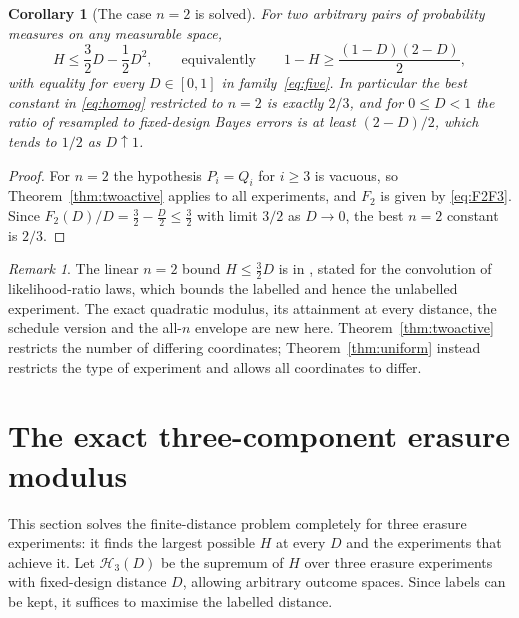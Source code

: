 \documentclass[11pt,a4paper]{article}
\newtheorem{corollary}[theorem]{Corollary}
\theoremstyle{definition}\newtheorem{definition}[theorem]{Definition}
\theoremstyle{remark}\newtheorem{remark}[theorem]{Remark}
\begin{document}
\begin{corollary}[The case $n=2$ is solved]\label{cor:n2}
For two arbitrary pairs of probability measures on any measurable space,
\[
H\le\frac32D-\frac12D^2,\qquad\text{equivalently}\qquad 1-H\ge\frac{(1-D)(2-D)}2 ,
\]
with equality for every $D\in[0,1]$ in family~\eqref{eq:five}. In particular the best constant in \eqref{eq:homog} restricted to $n=2$ is exactly $2/3$, and for $0\le D<1$ the ratio of resampled to fixed-design Bayes errors is at least $(2-D)/2$, which tends to $1/2$ as $D\uparrow1$.
\end{corollary}
\begin{proof}
For $n=2$ the hypothesis $P_i=Q_i$ for $i\ge3$ is vacuous, so Theorem~\ref{thm:twoactive} applies to all experiments, and $F_2$ is given by \eqref{eq:F2F3}. Since $F_2(D)/D=\frac32-\frac D2\le\frac32$ with limit $3/2$ as $D\to0$, the best $n=2$ constant is $2/3$.
\end{proof}

\begin{remark}\label{rem:oct}
The linear $n=2$ bound $H\le\frac32D$ is in \cite[Section~7.3]{KOct}, stated for the convolution of likelihood-ratio laws, which bounds the labelled and hence the unlabelled experiment. The exact quadratic modulus, its attainment at every distance, the schedule version and the all-$n$ envelope are new here. Theorem~\ref{thm:twoactive} restricts the number of differing coordinates; Theorem~\ref{thm:uniform} instead restricts the type of experiment and allows all coordinates to differ.
\end{remark}

\section{The exact three-component erasure modulus}\label{sec:three}
This section solves the finite-distance problem completely for three erasure experiments: it finds the largest possible $H$ at every $D$ and the experiments that achieve it. Let $\mathcal H_3(D)$ be the supremum of $H$ over three erasure experiments with fixed-design distance $D$, allowing arbitrary outcome spaces. Since labels can be kept, it suffices to maximise the labelled distance.
\end{document}
